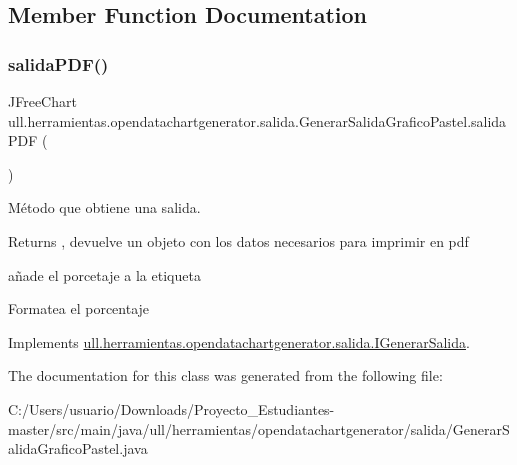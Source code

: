 \subsection{Member Function Documentation}
\mbox{\label{classull_1_1herramientas_1_1opendatachartgenerator_1_1salida_1_1_generar_salida_grafico_pastel_ad751df6b5bfef8e06f6b3601faad2440}} 
\subsubsection{\texorpdfstring{salida\+P\+D\+F()}{salidaPDF()}}
{\footnotesize\ttfamily J\+Free\+Chart ull.\+herramientas.\+opendatachartgenerator.\+salida.\+Generar\+Salida\+Grafico\+Pastel.\+salida\+P\+DF (\begin{DoxyParamCaption}{ }\end{DoxyParamCaption})}



Método que obtiene una salida. 

\begin{DoxyReturn}{Returns}
, devuelve un objeto con los datos necesarios para imprimir en pdf 
\end{DoxyReturn}
añade el porcetaje a la etiqueta

Formatea el porcentaje 

Implements \mbox{\hyperlink{interfaceull_1_1herramientas_1_1opendatachartgenerator_1_1salida_1_1_i_generar_salida_ac79d306ba661c9ee5375874289a3aa26}{ull.\+herramientas.\+opendatachartgenerator.\+salida.\+I\+Generar\+Salida}}.



The documentation for this class was generated from the following file\+:\begin{DoxyCompactItemize}
\item 
C\+:/\+Users/usuario/\+Downloads/\+Proyecto\+\_\+\+Estudiantes-\/master/src/main/java/ull/herramientas/opendatachartgenerator/salida/Generar\+Salida\+Grafico\+Pastel.\+java\end{DoxyCompactItemize}
